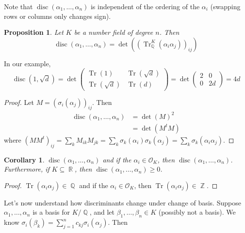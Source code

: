 \documentclass[11pt, a4paper]{memoir}
\DeclareMathOperator{\Q}{{\mathbb{Q}}}
\DeclareMathOperator{\Z}{{\mathbb{Z}}}
\DeclareMathOperator{\R}{{\mathbb{R}}}
\theoremstyle{change}
\newtheorem{corollary}[theorem]{Corollary}
\newtheorem{proposition}[theorem]{Proposition}
\theoremstyle{plain}
\theoremstyle{nonumberplain}
\newtheorem{proof}{Proof}
\DeclareMathOperator{\disc}{disc}
\DeclareMathOperator{\Tr}{Tr}
\begin{document}
Note that $\disc(\alpha_1,\ldots,\alpha_n)$ is independent of the ordering of the $\alpha_i$ (swapping rows or columns only changes sign).
\begin{proposition}
    Let $K$ be a number field of degree $n$.
    Then
    \begin{equation*}
        \disc(\alpha_1,\ldots,\alpha_n)=\det((\Tr_{\Q}^K(\alpha_i\alpha_j))_{ij})
    \end{equation*}
\end{proposition}
In our example,
\begin{equation*}
    \disc(1,\sqrt{d})=\det\begin{pmatrix}\Tr(1)&\Tr(\sqrt{d})\\\Tr(\sqrt{d})&\Tr(d)\end{pmatrix}=\det\begin{pmatrix}2&0\\0&2d\end{pmatrix}=4d
\end{equation*}
\begin{proof}
    Let $M=(\sigma_i(\alpha_j))_{ij}$.
    Then
    \begin{align*}
        \disc(\alpha_1,\ldots,\alpha_n) &= \det(M)^2\\
                                        &= \det(M^tM)
    \end{align*}
    where $(MM^t)_{ij}=\sum_k M_{ik}M_{jk}=\sum_k\sigma_k(\alpha_i)\sigma_k(\alpha_j)=\sum_k\sigma_k(\alpha_i\alpha_j)$.
\end{proof}
\begin{corollary}
    $\disc(\alpha_1,\ldots,\alpha_n)$ and if the $\alpha_i\in\mathcal{O}_K$, then $\disc(\alpha_1,\ldots,\alpha_n)$.
    Furthermore, if $K\subseteq\R$, then $\disc(\alpha_1,\ldots,\alpha_n)\geq0$.
\end{corollary}
\begin{proof}
    $\Tr(\alpha_i\alpha_j)\in\Q$ and if the $\alpha_i\in\mathcal{O}_K$, then $\Tr(\alpha_i\alpha_j)\in\Z$.
\end{proof}
Let's now understand how discriminants change under change of basis.
Suppose $\alpha_1,\ldots,\alpha_n$ is a basis for $K/\Q$, and let $\beta_1,\ldots,\beta_n\in K$ (possibly not a basis).
We know $\sigma_i(\beta_k)=\sum_{j=1}^n c_{kj}\sigma_i(\alpha_j)$.
Then
\end{document}
